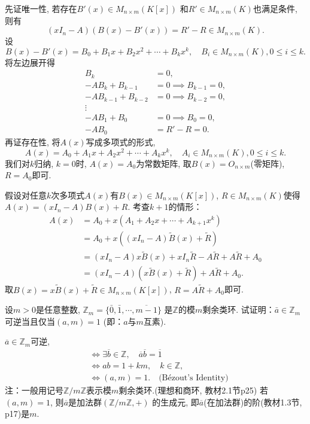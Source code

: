 \begin{solution}
    先证唯一性, 若存在$B'(x) \in M_{n \times m}(K[x])$
和$R' \in M_{n \times m}(K)$也满足条件, 则有
    \[
        (xI_n - A)(B(x) - B'(x)) = R' - R \in M_{n \times m}(K).
    \]
    设
\[
    B(x) - B'(x) = B_0 + B_1x + B_2x^2 + \cdots + B_kx^k, \quad B_i \in M_{n \times m}(K), 0 \leqslant i \leqslant k.
\]
    将左边展开得
\[
\begin{aligned}
    B_k &= 0,\\
    -AB_k + B_{k - 1} &= 0 \implies B_{k - 1} = 0,\\
    -AB_{k - 1} + B_{k - 2} &= 0 \implies B_{k - 2} = 0,\\
    \vdots\\
    -AB_1 + B_0 &= 0 \implies B_0 = 0,\\
    -AB_0 &= R' - R = 0.
\end{aligned}
\]
    再证存在性, 将$A(x)$写成多项式的形式,
\[
    A(x) = A_0 + A_1x + A_2x^2 + \cdots + A_kx^k, \quad A_i \in M_{n \times m}(K), 0 \leqslant i \leqslant k.
\]
我们对$k$归纳, $k = 0$时, $A(x) = A_0$为常数矩阵, 取$B(x) = O_{n \times m}$(零矩阵), 
$R = A_0$即可.

假设对任意$k$次多项式$A(x)$有$B(x) \in M_{n \times m}(K[x])$, $R \in M_{n \times m}(K)$使得
$A(x) = (xI_n - A)B(x) + R$. 考查$k + 1$的情形：
\[
\begin{aligned}
    A(x) &= A_0 + x(A_1 + A_2x + \cdots + A_{k + 1}x^k)\\
    &= A_0 + x((xI_n - A)\tilde{B}(x) + \tilde{R})\\
    &= (xI_n - A)x\tilde{B}(x) + xI_n\tilde{R} - A\tilde{R} + A\tilde{R}+ A_0\\
    &= (xI_n - A)(x\tilde{B}(x) + \tilde{R}) + A\tilde{R} + A_0.
\end{aligned}
\]
取$B(x) = x\tilde{B}(x) + \tilde{R} \in M_{n \times m}(K[x])$, 
$R = A\tilde{R} + A_0$即可.
\end{solution}

\begin{problem}
    设$m > 0$是任意整数, $\mathbb{Z}_m = \{\bar{0}, \bar{1}, \cdots, \overline{m-1}\}$
是$\mathbb{Z}$的模$m$剩余类环. 试证明：$\bar{a} \in \mathbb{Z}_m$可逆当且仅当$(a, m) = 1$
(即：$a$与$m$互素).
\end{problem}

\begin{solution}
    $\overline{a} \in \mathbb{Z}_m$可逆, 
\[
\begin{aligned}
    &\iff \exists \overline{b} \in \mathbb{Z}, \quad \overline{a}\overline{b} = \overline{1}\\
    &\iff ab = 1 + km, \quad k \in \mathbb{Z},\\
    &\iff (a, m) = 1. \quad \text{(Bézout's Identity)}
\end{aligned}
\]
注：一般用记号$\mathbb{Z}/m\mathbb{Z}$表示模$m$剩余类环.(理想和商环, 教材2.1节p25)
若$(a, m) = 1$, 则$\overline{a}$是加法群$(\mathbb{Z}/m\mathbb{Z}, +)$
的生成元, 即$\overline{a}$(在加法群)的阶(教材1.3节, p17)是$m$.
\end{solution}

